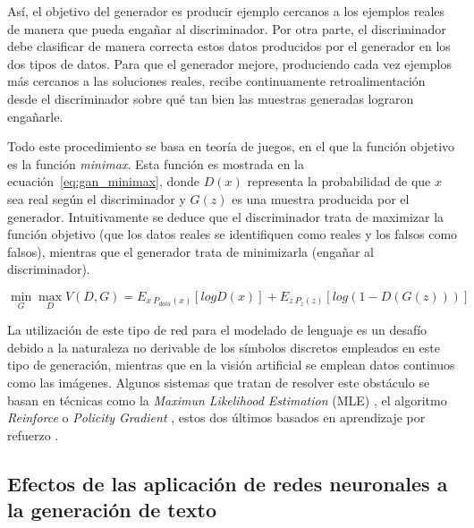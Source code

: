 Así, el objetivo del generador es producir ejemplo cercanos a los ejemplos reales de manera que pueda engañar al discriminador. Por otra parte, el discriminador debe clasificar de manera correcta estos datos producidos por el generador en los dos tipos de datos. Para que el generador mejore, produciendo cada vez ejemplos más cercanos a las soluciones reales, recibe continuamente retroalimentación desde el discriminador sobre qué tan bien las muestras generadas lograron engañarle.


Todo este procedimiento se basa en teoría de juegos, en el que la función objetivo es la función \textit{minimax}. Esta función es mostrada en la ecuación~\ref{eq:gan_minimax}, donde $D(x)$ representa la probabilidad de que $x$ sea real según el discriminador y $G(z)$ es una muestra producida por el generador. Intuitivamente se deduce que el discriminador trata de maximizar la función objetivo (que los datos reales se identifiquen como reales y los falsos como falsos), mientras que el generador trata de minimizarla (engañar al discriminador).

\begin{equation}
	\label{eq:gan_minimax}
	\underset{G}{\min}
	\underset{D}{\max}
	V(D,G) = E_{x~P_{data}(x)}[logD(x)] + E_{z~P_{z}(z)}[log(1-D(G(z)))]
\end{equation}


La utilización de este tipo de red para el modelado de lenguaje es un desafío debido a la naturaleza no derivable de los símbolos discretos empleados en este tipo de generación, mientras que en la visión artificial se emplean datos continuos como las imágenes. Algunos sistemas que tratan de resolver este obstáculo se basan en técnicas como la \textit{Maximun Likelihood Estimation} (MLE) \citep{li-etal-2017-adversarial}, el algoritmo \textit{Reinforce} o \textit{Policity Gradient} \citep{Yu2017SeqGANSG}, estos dos últimos basados en aprendizaje por refuerzo \citep{li-etal-2018-paraphrase, Shi2018TowardDT}.


\subsection{Efectos de las aplicación de redes neuronales a la generación de texto}

